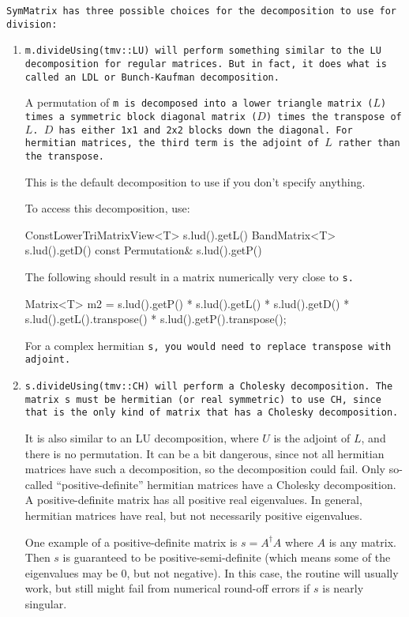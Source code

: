 \tt{SymMatrix} has three possible choices for the decomposition to use for division:
\begin{enumerate}
\item
\tt{m.divideUsing(tmv::LU)} will perform something similar to the LU decomposition
for regular matrices.  But in fact, it does what is called an LDL or Bunch-Kaufman
decomposition.  

A permutation of \tt{m} is decomposed into a lower triangle matrix ($L$)
times a symmetric block diagonal matrix ($D$) times the transpose of $L$.
$D$ has either 1x1 and 2x2 blocks down the diagonal.  For hermitian matrices,
the third term is the adjoint of $L$ rather than the transpose.

This is the default decomposition to use if you don't specify anything.

To access this decomposition, use:
\begin{tmvcode}
ConstLowerTriMatrixView<T> s.lud().getL()
BandMatrix<T> s.lud().getD()
const Permutation& s.lud().getP()
\end{tmvcode}
The following should result in a matrix numerically very close to \tt{s}.
\begin{tmvcode}
Matrix<T> m2 = s.lud().getP() * s.lud().getL() * s.lud().getD() * 
      s.lud().getL().transpose() * s.lud().getP().transpose();
\end{tmvcode}
For a complex hermitian \tt{s}, you would need to replace
\tt{transpose} with \tt{adjoint}.

\item
\tt{s.divideUsing(tmv::CH)} will perform a Cholesky decomposition.  
The matrix \tt{s} must be hermitian (or real symmetric) to use \tt{CH}, since that is the
only kind of matrix that has a Cholesky decomposition.  

It is also similar to an 
LU decomposition, where $U$ is the adjoint of $L$, and there is no permutation.
It can be a bit dangerous, since not all hermitian matrices have such a decomposition,
so the decomposition could fail.  Only so-called ``positive-definite'' hermitian 
matrices have a Cholesky decomposition.  A positive-definite matrix has
all positive real eigenvalues.  In general, hermitian matrices have real, but
not necessarily positive eigenvalues.  

One example of a 
positive-definite matrix is $s = A^\dagger A$ where $A$ is any matrix.   
Then $s$ is guaranteed to be positive-semi-definite
(which means some of the eigenvalues may be 0, but not negative).
In this case, the routine will usually work, but still might fail from 
numerical round-off errors if $s$ is nearly singular.  


\end{enumerate}
